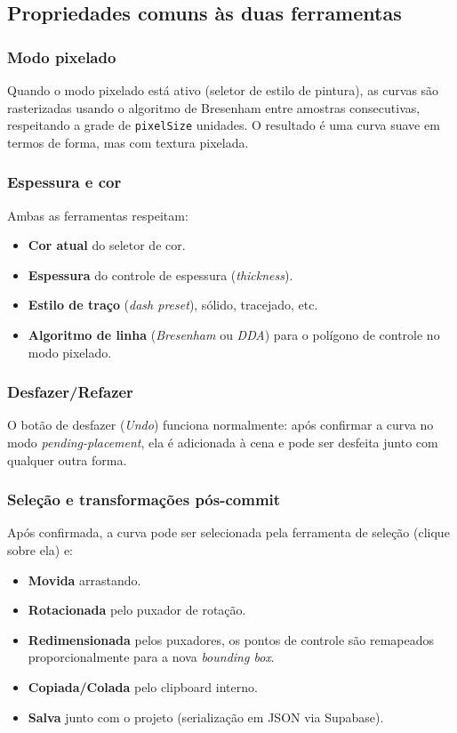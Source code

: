 \documentclass[12pt, a4paper]{article}
\theoremstyle{remark}
\newcommand{\code}[1]{\texttt{#1}}
\begin{document}
\subsection{Propriedades comuns às duas ferramentas}

\subsubsection*{Modo pixelado}

Quando o modo pixelado está ativo (seletor de estilo de pintura), as curvas
são rasterizadas usando o algoritmo de Bresenham entre amostras consecutivas,
respeitando a grade de \code{pixelSize} unidades. O resultado é uma curva
suave em termos de forma, mas com textura pixelada.

\subsubsection*{Espessura e cor}

Ambas as ferramentas respeitam:
\begin{itemize}
    \item \textbf{Cor atual} do seletor de cor.
    \item \textbf{Espessura} do controle de espessura (\emph{thickness}).
    \item \textbf{Estilo de traço} (\emph{dash preset}), sólido, tracejado, etc.
    \item \textbf{Algoritmo de linha} (\emph{Bresenham} ou \emph{DDA}) para o
          polígono de controle no modo pixelado.
\end{itemize}

\subsubsection*{Desfazer/Refazer}

O botão de desfazer (\emph{Undo}) funciona normalmente: após confirmar a curva
no modo \emph{pending-placement}, ela é adicionada à cena e pode ser desfeita
junto com qualquer outra forma.

\subsubsection*{Seleção e transformações pós-commit}

Após confirmada, a curva pode ser selecionada pela ferramenta de seleção
(clique sobre ela) e:
\begin{itemize}
    \item \textbf{Movida} arrastando.
    \item \textbf{Rotacionada} pelo puxador de rotação.
    \item \textbf{Redimensionada} pelos puxadores, os pontos de controle são
          remapeados proporcionalmente para a nova \emph{bounding box}.
    \item \textbf{Copiada/Colada} pelo clipboard interno.
    \item \textbf{Salva} junto com o projeto (serialização em JSON via
          Supabase).
\end{itemize}
\end{document}
